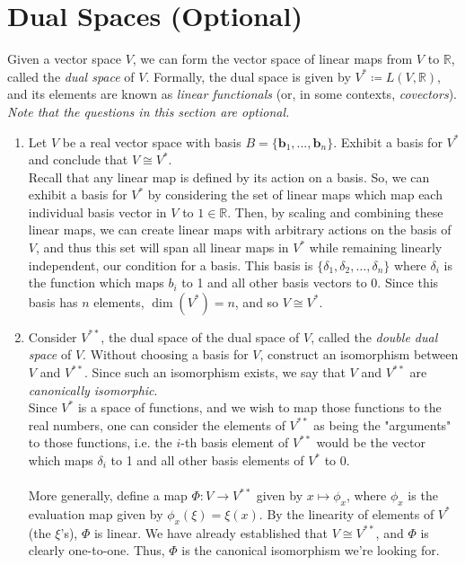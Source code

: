 \documentclass{article}
\begin{document}
\section{Dual Spaces (Optional)}
Given a vector space $V$, we can form the vector space of linear maps from $V$ to $\mathbb{R}$, called the \textit{dual space} of $V$. Formally, the dual space is given by $V^* \coloneqq L(V, \mathbb{R})$, and its elements are known as \textit{linear functionals} (or, in some contexts, \textit{covectors}). \textit{Note that the questions in this section are optional.}
\begin{enumerate}[label=\arabic*.]
	\item Let $V$ be a real vector space with basis $B = \{\textbf{b}_1, ... , \textbf{b}_n\}$. Exhibit a basis for $V^*$ and conclude that $V \cong V^*$. \\
	{\color{blue} Recall that any linear map is defined by its action on a basis. So, we can exhibit a basis for $V^*$ by considering the set of linear maps which map each individual basis vector in $V$ to $1 \in \mathbb{R}$. Then, by scaling and combining these linear maps, we can create linear maps with arbitrary actions on the basis of $V$, and thus this set will span all linear maps in $V^*$ while remaining linearly independent, our condition for a basis. This basis is $\{\delta_1, \delta_2, \ldots, \delta_n\}$ where $\delta_i$ is the function which maps $b_i$ to 1 and all other basis vectors to 0. Since this basis has $n$ elements, $\dim(V^*) = n$, and so $V \cong V^*$.}
	\item Consider $V^{**}$, the dual space of the dual space of $V$, called the \textit{double dual space} of $V$. Without choosing a basis for $V$, construct an isomorphism between $V$ and $V^{**}$. Since such an isomorphism exists, we say that $V$ and $V^{**}$ are \textit{canonically isomorphic}.\\
	{\color{blue} Since $V^*$ is a space of functions, and we wish to map those functions to the real numbers, one can consider the elements of $V^{**}$ as being the "arguments" to those functions, i.e. the $i$-th basis element of $V^{**}$ would be the vector which maps $\delta_i$ to 1 and all other basis elements of $V^*$ to 0. 
	\\ \\
	More generally, define a map $\Phi: V \to V^{**}$ given by $x \mapsto \phi_x$, where $\phi_x$ is the evaluation map given by $\phi_x(\xi) = \xi(x)$. By the linearity of elements of $V^*$ (the $\xi$'s), $\Phi$ is linear. We have already established that $V \cong V^{**}$, and $\Phi$ is clearly one-to-one. Thus, $\Phi$ is the canonical isomorphism we're looking for.}

\end{enumerate}
\end{document}
